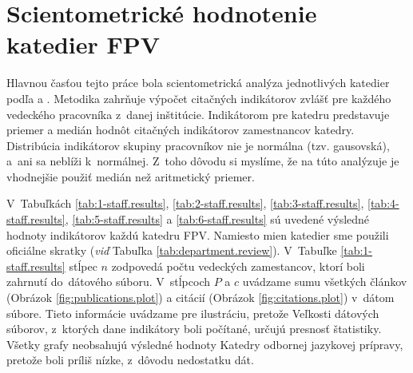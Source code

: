 \section{Scientometrické hodnotenie katedier FPV}

Hlavnou časťou tejto práce bola scientometrická analýza jednotlivých katedier
podľa \citet{Kazakis2014a} a \citet{Kazakis2014b,Kazakis2015}. Metodika zahrňuje
výpočet citačných indikátorov zvlášť pre každého vedeckého pracovníka
z~danej inštitúcie. Indikátorom pre katedru predstavuje priemer a medián
hodnôt citačných indikátorov zamestnancov katedry.
Distribúcia indikátorov skupiny pracovníkov nie je normálna (tzv. gausovská),
a~ani sa neblíži k~normálnej. Z~toho dôvodu si myslíme, že na túto analýzuje je
vhodnejšie použiť medián než aritmetický priemer.

V~Tabuľkách  \ref{tab:1-staff.results}, \ref{tab:2-staff.results},
\ref{tab:3-staff.results}, \ref{tab:4-staff.results}, \ref{tab:5-staff.results}
a \ref{tab:6-staff.results} sú uvedené výsledné hodnoty indikátorov každú
katedru FPV.  Namiesto mien katedier sme použili oficiálne skratky (\emph{viď}  Tabuľka
\ref{tab:department.review}).  V~Tabuľke  \ref{tab:1-staff.results} stĺpec $n$
zodpovedá počtu vedeckých zamestancov, ktorí boli zahrnutí do~dátového súboru.
V~stĺpcoch $P$ a $c$ uvádzame sumu všetkých článkov (Obrázok
\ref{fig:publications.plot}) a citácií (Obrázok \ref{fig:citations.plot})
v~dátom súbore.  Tieto informácie uvádzame pre ilustráciu, pretože Veľkosti
dátových súborov, z~ktorých dane indikátory boli počítané, určujú presnosť
štatistiky. Všetky grafy neobsahujú výsledné hodnoty Katedry odbornej
jazykovej prípravy, pretože boli príliš nízke, z~dôvodu nedostatku dát.


